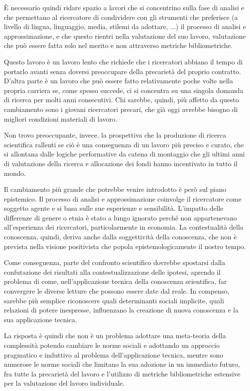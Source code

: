 \documentclass[a4paper, headings=standardclasses]{scrartcl}
\begin{document}
È necessario quindi ridare spazio a lavori che si concentrino sulla fase di analisi e che permettano al ricercatore di condividere con gli strumenti che preferisce (a livello di lingua, linguaggio, media, stilemi da adottare, ...) il processo di analisi e approssimazione, e che questo rientri nella valutazione del suo lavoro, valutazione che può essere fatta solo nel merito e non attraverso metriche bibliometriche. 

Questo lavoro è un lavoro lento che richiede che i ricercatori abbiano il tempo di portarlo avanti senza doversi preoccupare della precarietà del proprio contratto. D'altra parte è un lavoro che può essere fatto relativamente poche volte nella propria carriera se, come spesso succede, ci si concentra su una singola domanda di ricerca per molti anni consecutivi.
Chi sarebbe, quindi, più affetto da questo cambiamento sono i giovani ricercatori precari, che già oggi avrebbe bisogno di migliori condizioni materiali di lavoro.

Non trovo preoccupante, invece, la prospettiva che la produzione di ricerca scientifica rallenti se ciò è una conseguenza di un lavoro più preciso e curato, che si allontana dalle logiche performative da catena di montaggio che gli ultimi anni di valutazione della ricerca e allocazione dei fondi hanno incentivato in tutto il mondo.

Il cambiamento più grande che potrebbe venire introdotto è però sul piano epistemico.
Il processo di analisi e approssimazione coinvolge il ricercatore come soggetto agente e si basa sulle sue esperienze e sensibilità.
L'impatto delle differenze di genere o etnia è stato a lungo ignorato perché non appartenevano all'esperienza dei ricercatori, particolarmente in economia.
La contestualità della conoscenza, quindi, deriva anche dalla soggettività della conoscenza, che non è prevista nella visione positivista che popola epistemologicamente il nostro tempo.

Come conseguenza, parte del confronto scientifico dovrebbe spostarsi dalla confutazione dei risultati alla contestualizzazione delle ipotesi, aprendo il problema di come, nell'applicazione tecnica della conoscenza scientifica, far convergere le diverse letture che possono essere date dal reale.
In compenso, sarebbe più semplice riconoscere quali determinanti sociali implicite, quali relazioni di potere inespresse, influenzano la creazione di nuova conoscenza e la sua applicazione tecnica.

La risposta è quindi che non è un problema adottare una meta-teoria della complessità potendo cambiare le norme sociali e adottando un approccio pragmatico e induttivo al problema dell'applicazione tecnica, mentre sono numerose le norme sociali che limitano la sua adozione in un immediato futuro, fra tutte la precarietà del lavoro e l'utilizzo di metriche bibliometriche estensive per la valutazione del lavoro individuale.
\end{document}
